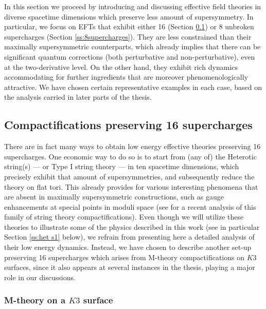 In this section we proceed by introducing and discussing effective field theories in diverse spacetime dimensions which preserve less amount of supersymmetry. In particular, we focus on EFTs that exhibit either 16 (Section \ref{ss:16supercharges}) or 8 unbroken supercharges (Section \ref{ss:8supercharges}). They are less constrained than their maximally supersymmetric counterparts, which already implies that there can be significant quantum corrections (both perturbative and non-perturbative), even at the two-derivative level. On the other hand, they exhibit rich dynamics accommodating for further ingredients that are moreover phenomenologically attractive. We have chosen certain representative examples in each case, based on the analysis carried in later parts of the thesis.

\subsection{Compactifications preserving 16 supercharges} \label{ss:16supercharges}

There are in fact many ways to obtain low energy effective theories preserving 16 supercharges. One economic way to do so is to start from (any of) the Heterotic string(s) --- or Type I string theory --- in ten spacetime dimensions, which precisely exhibit that amount of supersymmetries, and subsequently reduce the theory on flat tori. This already provides for various interesting phenomena that are absent in maximally supersymmetric constructions, such as gauge enhancements at special points in moduli space (see \cite{Font:2020rsk} for a recent analysis of this family of string theory compactifications). Even though we will utilize these theories to illustrate some of the physics described in this work (see in particular Section \ref{ss:het s1} below), we refrain from presenting here a detailed analysis of their low energy dynamics. Instead, we have chosen to describe another set-up preserving 16 supercharges which arises from M-theory compactifications on $K3$ surfaces, since it also appears at several instances in the thesis, playing a major role in our discussions.



\subsubsection{M-theory on a $K3$ surface}\label{sss:MtheoryonK3}

